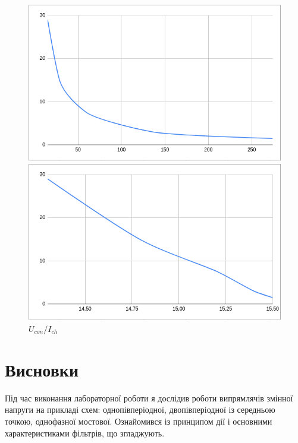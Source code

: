 \documentclass{article}
\begin{document}
\begin{normalsize}
		\begin{figure}[H]
		\begin{minipage}[t]{0.48\textwidth}
			\centering
			\includegraphics[width=\textwidth]{g4}
			\caption{$K_\text{п}/I_{ch}$}
		\end{minipage}
		\hfill
		\begin{minipage}[t]{0.48\textwidth}
			\centering
			\includegraphics[width=\textwidth]{g3}
			\caption{$U_{con}/I_{ch}$}
		\end{minipage}
	\end{figure}
	
	\section*{Висновки}
	Під час виконання лабораторної роботи я дослідив роботи випрямлячів змінної напруги на прикладі схем: однопівперіодної, двопівперіодної із середньою точкою, однофазної мостової. Ознайомився із принципом дії і основними характеристиками фільтрів, що згладжують.
	    
\end{normalsize}
\end{document}
